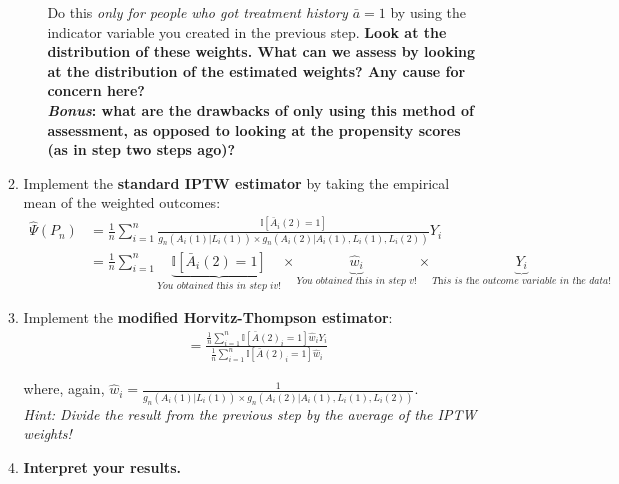 \documentclass[answers]{exam}
\begin{document}
\begin{enumerate}
\begin{enumerate}
\begin{enumerate}
Do this \textit{only for people who got treatment history $\bar{a} = 1$} by using the indicator variable you created in the previous step. \textbf{Look at the distribution of these weights. What can we assess by looking at the distribution of the estimated weights? Any cause for concern here?\\
\textit{Bonus}: what are the drawbacks of only using this method of assessment, as opposed to looking at the propensity scores (as in step two steps ago)?}
\end{enumerate}
\item Implement the \textbf{standard IPTW estimator} by taking the empirical mean of the weighted outcomes:
\begin{align*}
\hat{\Psi}(P_n) & =\frac{1}{n}\sum_{i=1}^n\frac{\mathbb{I}[\bar{A}_i(2)=1]}{g_n(A_i(1)|L_i(1))\times g_n(A_i(2)|A_i(1), L_i(1), L_i(2))}Y_i \\
& =\frac{1}{n}\sum_{i=1}^n\underbrace{\mathbb{I}[\bar{A}_i(2)=1]}_{\textit{You obtained this in step iv!}} \times \underbrace{\hat{w}_i}_{\textit{You obtained this in step v!}} \times \underbrace{Y_i}_{\textit{This is the outcome variable in the data!}}
\end{align*}
\item Implement the \textbf{modified Horvitz-Thompson estimator}:
\begin{align*}
& = \frac{\frac{1}{n}\sum_{i=1}^n\mathbb{I}[\bar{A}(2)_i=1]\hat{w}_iY_i}{\frac{1}{n}\sum_{i=1}^n\mathbb{I}[\bar{A}(2)_i=1]\hat{w}_i}
\end{align*}

where, again, $\hat{w}_i = \frac{1}{g_n(A_i(1)|L_i(1))\times g_n(A_i(2)|A_i(1), L_i(1), L_i(2))}$. \\
\textit{Hint: Divide the result from the previous step by the average of the IPTW weights!}
\item \textbf{Interpret your results.}
\end{enumerate}

\begin{solution}



\end{solution}
\end{enumerate}
\end{document}

